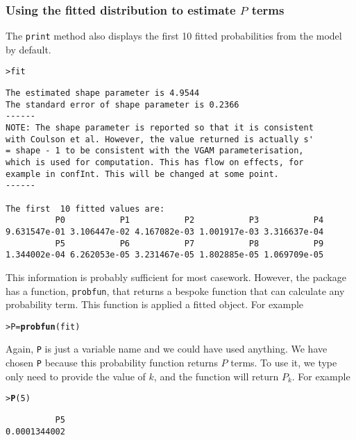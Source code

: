 \documentclass{article}\usepackage[]{graphicx}\usepackage[]{xcolor}
\makeatletter
\newcommand{\hlnum}[1]{\textcolor[rgb]{0.686,0.059,0.569}{#1}}%
\newcommand{\hlstd}[1]{\textcolor[rgb]{0.345,0.345,0.345}{#1}}%
\newcommand{\hlkwb}[1]{\textcolor[rgb]{0.69,0.353,0.396}{#1}}%
\newcommand{\hlkwd}[1]{\textcolor[rgb]{0.737,0.353,0.396}{\textbf{#1}}}%
\newenvironment{kframe}{%
 \def\at@end@of@kframe{}%
 \ifinner\ifhmode%
  \def\at@end@of@kframe{\end{minipage}}%
  \begin{minipage}{\columnwidth}%
 \fi\fi%
 \def\FrameCommand##1{\hskip\@totalleftmargin \hskip-\fboxsep
 \colorbox{shadecolor}{##1}\hskip-\fboxsep
     \hskip-\linewidth \hskip-\@totalleftmargin \hskip\columnwidth}%
 \MakeFramed {\advance\hsize-\width
   \@totalleftmargin\z@ \linewidth\hsize
   \@setminipage}}%
 {\par\unskip\endMakeFramed%
 \at@end@of@kframe}
\newenvironment{knitrout}{}{} %
\newcommand{\rcode}[1]{\lstinline[language=R,basicstyle=\normalsize\ttfamily]!#1!}
\makeatother
\begin{document}
\subsubsection{Using the fitted distribution to estimate $P$ terms}
The \rcode{print} method also displays the first 10 fitted probabilities from the model by default.
\begin{knitrout}
\color{fgcolor}\begin{kframe}
\begin{alltt}
\hlstd{> }\hlstd{fit}
\end{alltt}
\begin{verbatim}
The estimated shape parameter is 4.9544 
The standard error of shape parameter is 0.2366 
------
NOTE: The shape parameter is reported so that it is consistent
with Coulson et al. However, the value returned is actually s'
= shape - 1 to be consistent with the VGAM parameterisation,
which is used for computation. This has flow on effects, for
example in confInt. This will be changed at some point.
------

The first  10 fitted values are:
          P0           P1           P2           P3           P4 
9.631547e-01 3.106447e-02 4.167082e-03 1.001917e-03 3.316637e-04 
          P5           P6           P7           P8           P9 
1.344002e-04 6.262053e-05 3.231467e-05 1.802885e-05 1.069709e-05 
\end{verbatim}
\end{kframe}
\end{knitrout}
This information is probably sufficient for most casework. However, the package has a function, \rcode{probfun}, that returns a bespoke function that can calculate any probability term. This function is applied a fitted object. For example
\begin{knitrout}
\color{fgcolor}\begin{kframe}
\begin{alltt}
\hlstd{> }\hlstd{P} \hlkwb{=} \hlkwd{probfun}\hlstd{(fit)}
\end{alltt}
\end{kframe}
\end{knitrout}
Again, \rcode{P} is just a variable name and we could have used anything. We have chosen \rcode{P} because this probability function returns $P$ terms. To use it, we type only need to provide the value of $k$, and the function will return $P_k$. For example
\begin{knitrout}
\color{fgcolor}\begin{kframe}
\begin{alltt}
\hlstd{> }\hlkwd{P}\hlstd{(}\hlnum{5}\hlstd{)}
\end{alltt}
\begin{verbatim}
          P5 
0.0001344002 
\end{verbatim}
\end{kframe}
\end{knitrout}
\end{document}
